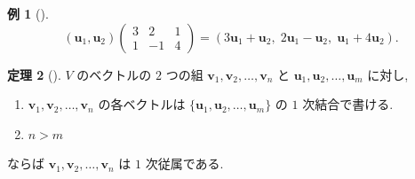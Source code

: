 \documentclass[dvipdfmx,a4paper,11pt]{article} %
\theoremstyle{definition}
\newtheorem{thm}{定理}[section]
\newtheorem{eg}[thm]{例}
\begin{document}
\begin{eg}[{\cite[例3]{M}}] 
\[
(\bm{u}_1,\bm{u}_2)
\begin{pmatrix}
3&2&1\\
1&-1&4
\end{pmatrix}
=(3\bm{u}_1+\bm{u}_2,\;2\bm{u}_1-\bm{u}_2,\;\bm{u}_1+4\bm{u}_2).
\]
\end{eg}


\begin{thm}[{\cite[定理4.2.3]{M}}] 
\label{thm-M-4.2.3}
\(V\) のベクトルの \(2\) つの組 \(\bm{v}_1,\bm{v}_2,\ldots,\bm{v}_n\) と \(\bm{u}_1,\bm{u}_2,\ldots,\bm{u}_m\) に対し, 
\begin{enumerate}
\item[(1)] \(\bm{v}_1,\bm{v}_2,\ldots,\bm{v}_n\) の各ベクトルは \(\{\bm{u}_1,\bm{u}_2,\ldots,\bm{u}_m\}\) の \(1\) 次結合で書ける.
\item[(2)] \(n>m\)
\end{enumerate}
ならば \(\bm{v}_1,\bm{v}_2,\ldots,\bm{v}_n\) は \(1\) 次従属である.
\end{thm}
\end{document}
